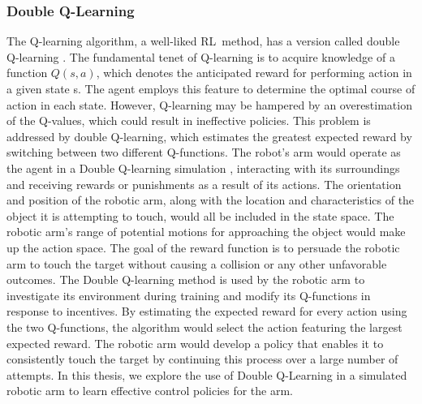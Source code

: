 \documentclass[12pt,oneside]{article}
\begin{document}
\subsubsection{Double Q-Learning}
The Q-learning algorithm, a well-liked RL method, has a version called double Q-learning \cite{33_ogunniyi2014energy}. The fundamental tenet of Q-learning is to acquire knowledge of a function $Q(s,a)$, which denotes the anticipated reward for performing action in a given state s. The agent employs this feature to determine the optimal course of action in each state. However, Q-learning may be hampered by an overestimation of the Q-values, which could result in ineffective policies. This problem is addressed by double Q-learning, which estimates the greatest expected reward by switching between two different Q-functions.
The robot's arm would operate as the agent in a Double Q-learning simulation \cite{34_weng2020mean}, interacting with its surroundings and receiving rewards or punishments as a result of its actions. The orientation and position of the robotic arm, along with the location and characteristics of the object it is attempting to touch, would all be included in the state space. The robotic arm's range of potential motions for approaching the object would make up the action space. The goal of the reward function is to persuade the robotic arm to touch the target without causing a collision or any other unfavorable outcomes.
The Double Q-learning method is used by the robotic arm to investigate its environment during training and modify its Q-functions in response to incentives. By estimating the expected reward for every action using the two Q-functions, the algorithm would select the action featuring the largest expected reward. The robotic arm would develop a policy that enables it to consistently touch the target by continuing this process over a large number of attempts. In this thesis, we explore the use of Double Q-Learning in a simulated robotic arm to learn effective control policies for the arm.
\end{document}
